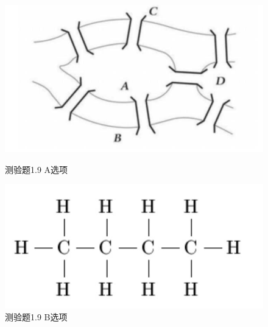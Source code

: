 \documentclass[UTF8, heading=true]{ctexart}
\begin{document}
\begin{figure}[H]
    \centering
    \begin{minipage}[t]{0.35\textwidth}
        \centering
        \includegraphics[width=1\textwidth]{./img/1.9_1.jpg} %
        \caption{测验题1.9 A选项}
    \end{minipage}
    \hfill
    \begin{minipage}[t]{0.35\textwidth}
        \centering
        \includegraphics[width=1\textwidth]{1.9_2.jpg} %
        \caption{测验题1.9 B选项}
\end{minipage}
\end{figure}
\end{document}
